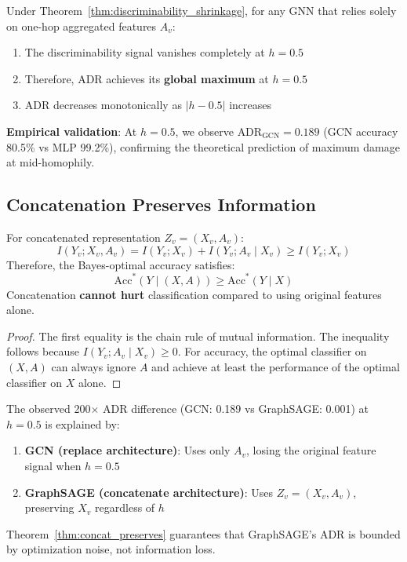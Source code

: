 \begin{corollary}[ADR Peaks at $h = 0.5$]
\label{cor:adr_peak}
Under Theorem~\ref{thm:discriminability_shrinkage}, for any GNN that relies solely on one-hop aggregated features $A_v$:
\begin{enumerate}
    \item The discriminability signal vanishes completely at $h = 0.5$
    \item Therefore, ADR achieves its \textbf{global maximum} at $h = 0.5$
    \item ADR decreases monotonically as $|h - 0.5|$ increases
\end{enumerate}

\textbf{Empirical validation}: At $h = 0.5$, we observe $\text{ADR}_{\text{GCN}} = 0.189$ (GCN accuracy 80.5\% vs MLP 99.2\%), confirming the theoretical prediction of maximum damage at mid-homophily.
\end{corollary}

\subsection{Concatenation Preserves Information}
\label{subsec:concat}

\begin{theorem}
\label{thm:concat_preserves}
For concatenated representation $Z_v = (X_v, A_v)$:
\begin{equation}
    I(Y_v; X_v, A_v) = I(Y_v; X_v) + I(Y_v; A_v \mid X_v) \geq I(Y_v; X_v)
\end{equation}
Therefore, the Bayes-optimal accuracy satisfies:
\begin{equation}
    \mathrm{Acc}^*(Y \mid (X, A)) \geq \mathrm{Acc}^*(Y \mid X)
\end{equation}
Concatenation \textbf{cannot hurt} classification compared to using original features alone.
\end{theorem}

\begin{proof}
The first equality is the chain rule of mutual information. The inequality follows because $I(Y_v; A_v \mid X_v) \geq 0$. For accuracy, the optimal classifier on $(X, A)$ can always ignore $A$ and achieve at least the performance of the optimal classifier on $X$ alone.
\end{proof}

\begin{corollary}
\label{cor:200x_explained}
The observed 200$\times$ ADR difference (GCN: 0.189 vs GraphSAGE: 0.001) at $h = 0.5$ is explained by:
\begin{enumerate}
    \item \textbf{GCN (replace architecture)}: Uses only $A_v$, losing the original feature signal when $h = 0.5$
    \item \textbf{GraphSAGE (concatenate architecture)}: Uses $Z_v = (X_v, A_v)$, preserving $X_v$ regardless of $h$
\end{enumerate}
Theorem~\ref{thm:concat_preserves} guarantees that GraphSAGE's ADR is bounded by optimization noise, not information loss.
\end{corollary}

